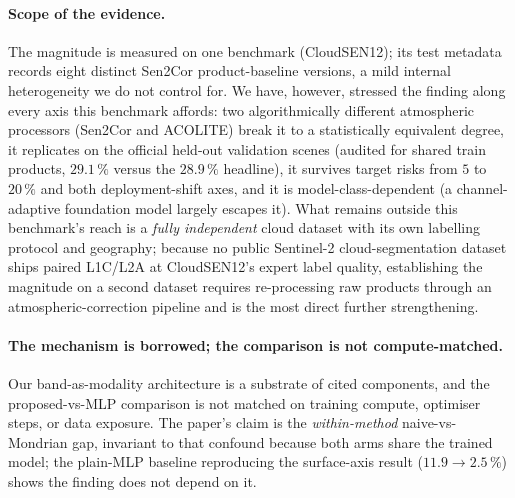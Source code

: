 \documentclass[preprint,3p,times]{elsarticle}
\begin{document}
\paragraph{Scope of the evidence.} The magnitude is measured on one benchmark (CloudSEN12); its test metadata records eight distinct Sen2Cor product-baseline versions, a mild internal heterogeneity we do not control for. We have, however, stressed the finding along every axis this benchmark affords: two algorithmically different atmospheric processors (Sen2Cor and ACOLITE) break it to a statistically equivalent degree, it replicates on the official held-out validation scenes (audited for shared train products, $29.1\,\%$ versus the $28.9\,\%$ headline), it survives target risks from $5$ to $20\,\%$ and both deployment-shift axes, and it is model-class-dependent (a channel-adaptive foundation model largely escapes it). What remains outside this benchmark's reach is a \emph{fully independent} cloud dataset with its own labelling protocol and geography; because no public Sentinel-2 cloud-segmentation dataset ships paired L1C/L2A at CloudSEN12's expert label quality, establishing the magnitude on a second dataset requires re-processing raw products through an atmospheric-correction pipeline and is the most direct further strengthening.

\paragraph{The mechanism is borrowed; the comparison is not compute-matched.} Our band-as-modality architecture is a substrate of cited components, and the proposed-vs-MLP comparison is not matched on training compute, optimiser steps, or data exposure. The paper's claim is the \emph{within-method} naive-vs-Mondrian gap, invariant to that confound because both arms share the trained model; the plain-MLP baseline reproducing the surface-axis result ($11.9 \to 2.5\,\%$) shows the finding does not depend on it.
\end{document}
